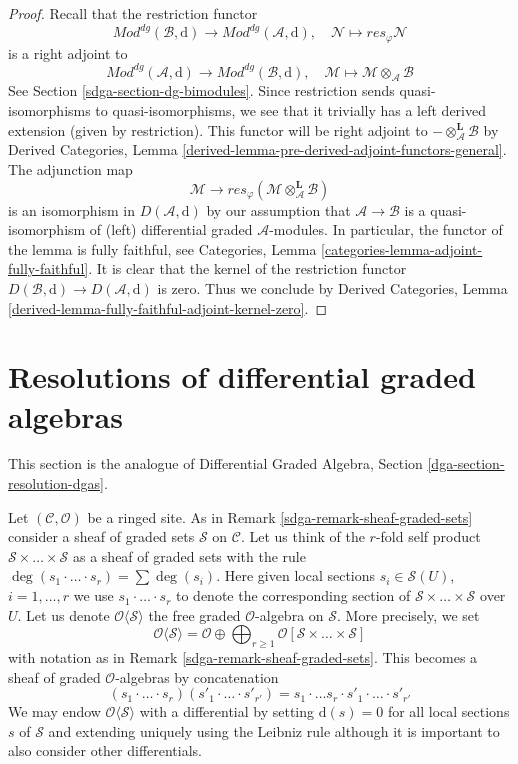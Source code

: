 \begin{proof}
Recall that the restriction functor
$$
\textit{Mod}^{dg}(\mathcal{B}, \text{d}) \to
\textit{Mod}^{dg}(\mathcal{A}, \text{d}),\quad
\mathcal{N} \mapsto res_\varphi \mathcal{N}
$$
is a right adjoint to
$$
\textit{Mod}^{dg}(\mathcal{A}, \text{d}) \to
\textit{Mod}^{dg}(\mathcal{B}, \text{d}),\quad
\mathcal{M} \mapsto \mathcal{M} \otimes_\mathcal{A} \mathcal{B}
$$
See Section \ref{sdga-section-dg-bimodules}. Since restriction
sends quasi-isomorphisms to quasi-isomorphisms, we see that
it trivially has a left derived extension (given by
restriction). This functor will be right adjoint to
$- \otimes_\mathcal{A}^\mathbf{L} \mathcal{B}$ by
Derived Categories, Lemma
\ref{derived-lemma-pre-derived-adjoint-functors-general}.
The adjunction map
$$
\mathcal{M} \to
res_\varphi(\mathcal{M} \otimes_\mathcal{A}^\mathbf{L} \mathcal{B})
$$
is an isomorphism in $D(\mathcal{A}, \text{d})$ by our assumption
that $\mathcal{A} \to \mathcal{B}$ is a quasi-isomorphism of
(left) differential graded $\mathcal{A}$-modules. In particular,
the functor of the lemma is fully faithful, see
Categories, Lemma \ref{categories-lemma-adjoint-fully-faithful}.
It is clear that the kernel of the restriction functor
$D(\mathcal{B}, \text{d}) \to D(\mathcal{A}, \text{d})$
is zero. Thus we conclude by Derived Categories, Lemma
\ref{derived-lemma-fully-faithful-adjoint-kernel-zero}.
\end{proof}

\section{Resolutions of differential graded algebras}
\label{sdga-section-resolution-dgas}
This section is the analogue of
Differential Graded Algebra, Section \ref{dga-section-resolution-dgas}.

\medskip\noindent
Let $(\mathcal{C}, \mathcal{O})$ be a ringed site. As in
Remark \ref{sdga-remark-sheaf-graded-sets} consider a
sheaf of graded sets $\mathcal{S}$ on $\mathcal{C}$.
Let us think of the $r$-fold self product
$\mathcal{S} \times \ldots \times \mathcal{S}$
as a sheaf of graded sets with the rule
$\deg(s_1 \cdot \ldots \cdot s_r) = \sum \deg(s_i)$.
Here given local sections $s_i \in \mathcal{S}(U)$, $i = 1, \ldots, r$
we use $s_1 \cdot \ldots \cdot s_r$
to denote the corresponding section of
$\mathcal{S} \times \ldots \times \mathcal{S}$
over $U$. Let us denote $\mathcal{O}\langle \mathcal{S} \rangle$
the free graded $\mathcal{O}$-algebra on $\mathcal{S}$.
More precisely, we set
$$
\mathcal{O}\langle \mathcal{S} \rangle =
\mathcal{O} \oplus
\bigoplus\nolimits_{r \geq 1}
\mathcal{O}[\mathcal{S} \times \ldots \times \mathcal{S}]
$$
with notation as in Remark \ref{sdga-remark-sheaf-graded-sets}.
This becomes a sheaf of graded $\mathcal{O}$-algebras by
concatenation
$$
(s_1 \cdot \ldots \cdot s_r)  (s'_1 \cdot \ldots \cdot s'_{r'}) =
s_1 \cdot \ldots s_r \cdot s'_1 \cdot \ldots \cdot s'_{r'}
$$
We may endow $\mathcal{O}\langle \mathcal{S} \rangle$
with a differential by setting $\text{d}(s) = 0$
for all local sections $s$ of $\mathcal{S}$
and extending uniquely using the Leibniz rule
although it is important to also consider other differentials.

